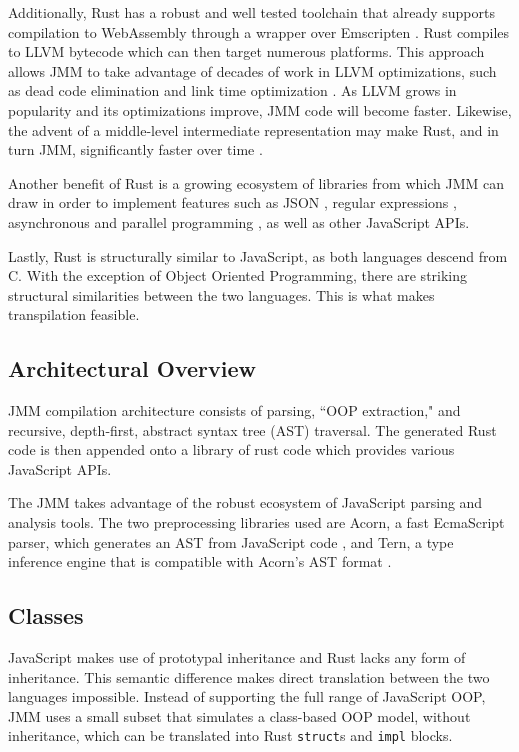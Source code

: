 \documentclass[12pt]{article}
\begin{document}
	Additionally, Rust has a robust and well tested toolchain that already supports compilation to WebAssembly through a wrapper over Emscripten \cite{Rubanov2017}. Rust compiles to LLVM bytecode which can then target numerous platforms. This approach allows JMM to take advantage of decades of work in LLVM optimizations, such as dead code elimination and link time optimization \cite{llvm2017}. As LLVM grows in popularity and its optimizations improve, JMM code will become faster. Likewise, the advent of a middle-level intermediate representation may make Rust, and in turn JMM, significantly faster over time \cite{Matsakis2016}.
	
	Another benefit of Rust is a growing ecosystem of libraries from which JMM can draw in order to implement features such as JSON \cite{serde}, regular expressions \cite{regex}, asynchronous \cite{async} and parallel programming \cite{rayon}, as well as other JavaScript APIs.
	
	Lastly, Rust is structurally similar to JavaScript, as both languages descend from C. With the exception of Object Oriented Programming, there are striking structural similarities between the two languages. This is what makes transpilation feasible.
	
	\subsection{Architectural Overview}
	
	JMM compilation architecture consists of parsing, ``OOP extraction," and recursive, depth-first, abstract syntax tree (AST) traversal. The generated Rust code is then appended onto a library of rust code which provides various JavaScript APIs.
	
	The JMM takes advantage of the robust ecosystem of JavaScript parsing and analysis tools. The two preprocessing libraries used are Acorn, a fast EcmaScript parser, which generates an AST from JavaScript code \cite{Acorn}, and Tern, a type inference engine that is compatible with Acorn's AST format \cite{Tern}.
	
	\subsection{Classes}
	
	JavaScript makes use of prototypal inheritance and Rust lacks any form of inheritance. This semantic difference makes direct translation between the two languages impossible. Instead of supporting the full range of JavaScript OOP, JMM uses a small subset that simulates a class-based OOP model, without inheritance, which can be translated into Rust \texttt{struct}s and \texttt{impl} blocks. 
	
\end{document}
